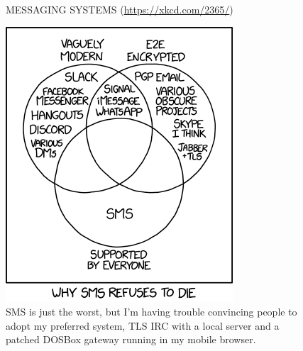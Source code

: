 \begin{figure}[htb]
\centering
\caption*{\uppercase{Messaging Systems} (\url{https://xkcd.com/2365/})}
\includegraphics[scale=0.39]{messaging_systems}
\caption*{SMS is just the worst, but I'm having trouble convincing people to adopt my preferred system, TLS IRC with a local server and a patched DOSBox gateway running in my mobile browser.}
\label{figure-xkcd-2365}
\end{figure}